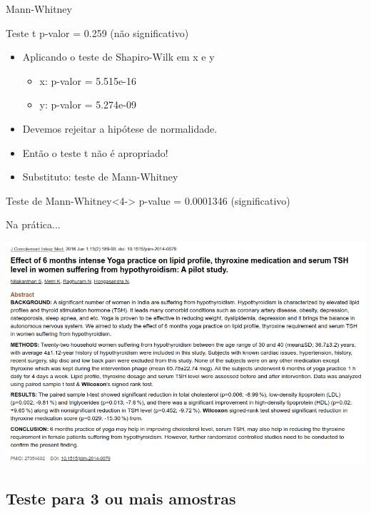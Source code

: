 \documentclass{beamer}
\begin{document}
\begin{frame}{\scriptsize Mann-Whitney}
  \begin{exampleblock}{Teste t}
    \scriptsize
    p-valor = 0.259 (não significativo)
  \end{exampleblock}
  \begin{itemize}
    \footnotesize
  \item<2-> Aplicando o teste de Shapiro-Wilk em x e y
    \begin{itemize}
      \tiny
    \item<2-> x: p-valor = 5.515e-16
    \item<2-> y: p-valor = 5.274e-09
    \end{itemize}
    \bigskip
  \item<3-> Devemos rejeitar a hipótese de normalidade.
  \item<3-> Então o teste t \alert{não é} apropriado!
  \item<3-> Substituto: teste de Mann-Whitney
  \end{itemize}
  \begin{exampleblock}{Teste de Mann-Whitney}<4->
    \footnotesize
    p-value = \alert{0.0001346} (significativo)
  \end{exampleblock}
\end{frame}

\begin{frame}{\scriptsize Na prática...}
  \begin{center}
    \includegraphics[width=\textwidth]{Cap37-38/exemplo-wilcoxon}
  \end{center}
\end{frame}

\subsection[3+ amostras]{Teste para 3 ou mais amostras}
\end{document}
